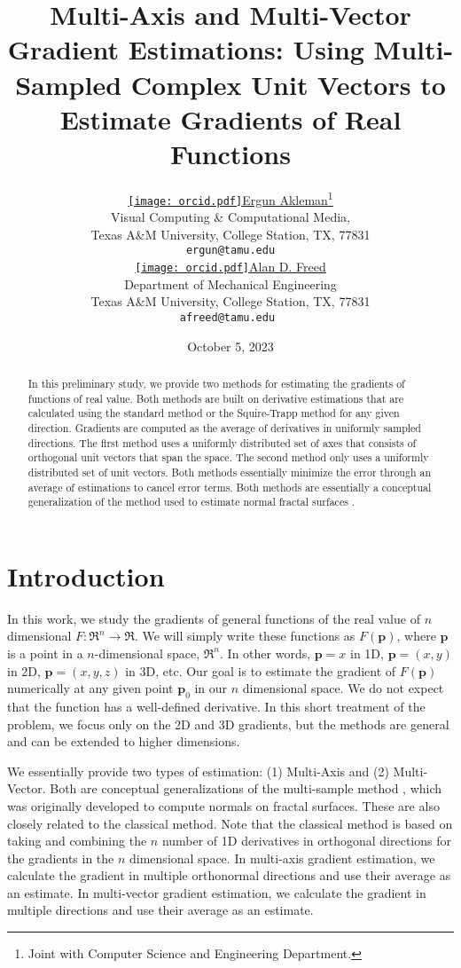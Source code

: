 \documentclass{article}
\title{Multi-Axis and Multi-Vector Gradient Estimations: Using Multi-Sampled Complex Unit Vectors to Estimate Gradients of Real Functions}
\date{October 5, 2023}	%
\author{ 
 \href{https://orcid.org/0000-0003-3618-4166}{\texttt{[image: orcid.pdf]}\hspace{1mm}Ergun Akleman}\thanks{Joint with Computer Science and Engineering Department.} \\
	Visual Computing \& Computational Media,\\ Texas A\&M University, College Station, TX, 77831\\
	\texttt{ergun@tamu.edu} \\
  \And
	 \href{https://orcid.org/0000-0002-3492-0628}{\texttt{[image: orcid.pdf]}\hspace{1mm}Alan D. Freed}\\
Department of Mechanical Engineering\\ 
Texas A\&M University, College Station, TX, 77831\\
	\texttt{afreed@tamu.edu } \\
}
\begin{document}
\maketitle

\begin{abstract}
In this preliminary study, we provide two methods for estimating the gradients of functions of real value. Both methods are built on derivative estimations that are calculated using the standard method or the Squire-Trapp method \cite{squire1998} for any given direction. Gradients are computed as the average of derivatives in
uniformly sampled directions. The first method uses a uniformly distributed set of axes that consists of orthogonal unit vectors that span the space. The second method only uses a uniformly distributed set of unit vectors. Both methods essentially minimize the error through an average of estimations to cancel error terms. Both methods are essentially a conceptual generalization of the method used to estimate normal fractal surfaces \cite{hart1989}. 
\end{abstract}  

\section{Introduction}

In this work, we study the gradients of general functions of the real value of $n$ dimensional $F:\Re^n \rightarrow \Re$. We will simply write these functions as
$F(\mathbf{p})$, where $\mathbf{p}$ is a point in a $n$-dimensional space, $\Re^n$. In other words, $\mathbf{p}=x$ in 1D, $\mathbf{p}=(x,y)$ in 2D, $\mathbf{p}=(x,y,z)$ in 3D, etc.  Our goal is to estimate the gradient of $F(\mathbf{p})$ numerically at any given point $\mathbf{p}_0$ in our $n$ dimensional space. We do not expect that the function has a well-defined derivative. In this short treatment of the problem, we focus only on the 2D and 3D gradients, but the methods are general and can be extended to higher dimensions. 

We essentially provide two types of estimation: (1) Multi-Axis and (2) Multi-Vector. Both are conceptual generalizations of the multi-sample method \cite{hart1989}, which was originally developed to compute normals on fractal surfaces. These are also closely related to the classical method. Note that the classical method is based on taking and combining the $n$ number of 1D derivatives in orthogonal directions for the gradients in the $n$ dimensional space. In multi-axis gradient estimation, we calculate the gradient in multiple orthonormal directions and use their average as an estimate. In multi-vector gradient estimation, we calculate the gradient in multiple directions and use their average as an estimate. 
\end{document}
